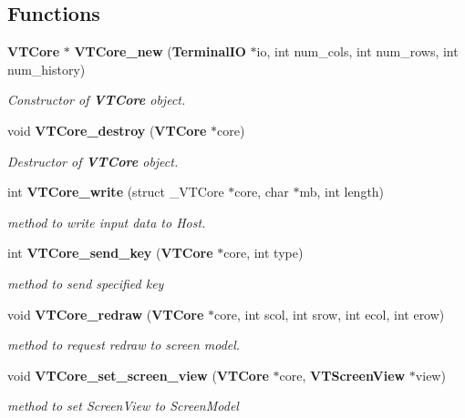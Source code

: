 \subsection*{Functions}
\begin{CompactItemize}
\item 
{\bf VTCore} $\ast$ {\bf VTCore\_\-new} ({\bf Terminal\-IO} $\ast$io, int num\_\-cols, int num\_\-rows, int num\_\-history)
\begin{CompactList}\small\item\em Constructor of {\bf VTCore} object.\item\end{CompactList}\item 
void {\bf VTCore\_\-destroy} ({\bf VTCore} $\ast$core)
\begin{CompactList}\small\item\em Destructor of {\bf VTCore} object.\item\end{CompactList}\item 
int {\bf VTCore\_\-write} (struct \_\-VTCore $\ast$core, char $\ast$mb, int length)
\begin{CompactList}\small\item\em method to write input data to Host.\item\end{CompactList}\item 
int {\bf VTCore\_\-send\_\-key} ({\bf VTCore} $\ast$core, int type)
\begin{CompactList}\small\item\em method to send specified key\item\end{CompactList}\item 
void {\bf VTCore\_\-redraw} ({\bf VTCore} $\ast$core, int scol, int srow, int ecol, int erow)
\begin{CompactList}\small\item\em method to request redraw to screen model.\item\end{CompactList}\item 
void {\bf VTCore\_\-set\_\-screen\_\-view} ({\bf VTCore} $\ast$core, {\bf VTScreen\-View} $\ast$view)
\begin{CompactList}\small\item\em method to set Screen\-View to Screen\-Model\item\end{CompactList}\item 

\end{CompactItemize}
